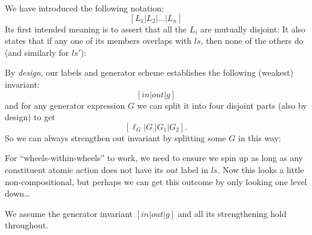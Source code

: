 \label{ha:mViews}


We have introduced the following notation:
\[
  [ L_1 | L_2 | \dots | L_n ]
\]
Its first intended meaning is to assert that
all the $L_i$ are mutually disjoint:
It also states that if any one of its members overlaps with $ls$,
then none of the others do (and similarly for $ls'$):

By \emph{design}, our labels and generator scheme
establishes the following (weakest) invariant:
\[ [in|out|g]\]
and for any generator expression $G$ we can split it into
four disjoint parts (also by design) to get
\[  [\ell_G|G_{:}|G_1|G_2] . \]
So we can always strengthen out invariant by splitting some $G$
in this way:

\newpage
{}

For ``wheels-within-wheels'' to work,
we need to ensure we spin up as long as any constituent
atomic action does not have its $out$ label in $ls$.
Now this looks a little non-compositional,
but perhaps we can get this outcome by only looking one level down\dots

We assume the generator invariant $[in|out|g]$
and all its strengthening hold throughout.





